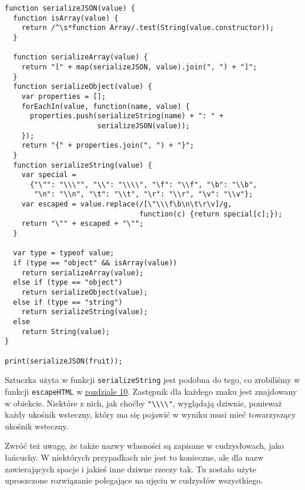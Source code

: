 \begin{verbatim} 
function serializeJSON(value) {
  function isArray(value) {
    return /^\s*function Array/.test(String(value.constructor));
  }

  function serializeArray(value) {
    return "[" + map(serializeJSON, value).join(", ") + "]";
  }
  function serializeObject(value) {
    var properties = [];
    forEachIn(value, function(name, value) {
      properties.push(serializeString(name) + ": " +
                      serializeJSON(value));
    });
    return "{" + properties.join(", ") + "}";
  }
  function serializeString(value) {
    var special =
      {"\"": "\\\"", "\\": "\\\\", "\f": "\\f", "\b": "\\b",
       "\n": "\\n", "\t": "\\t", "\r": "\\r", "\v": "\\v"};
    var escaped = value.replace(/[\"\\\f\b\n\t\r\v]/g,
                                function(c) {return special[c];});
    return "\"" + escaped + "\"";
  }

  var type = typeof value;
  if (type == "object" && isArray(value))
    return serializeArray(value);
  else if (type == "object")
    return serializeObject(value);
  else if (type == "string")
    return serializeString(value);
  else
    return String(value);
}

print(serializeJSON(fruit));
\end{verbatim}
    
Sztuczka użyta w funkcji \texttt{serializeString} jest podobna do tego, co zrobiliśmy w funkcji \texttt{escapeHTML} w \hyperref[chap:10]{rozdziale 10}. Zastępnik dla każdego znaku jest znajdowany w obiekcie. Niektóre z nich, jak choćby \texttt{"\textbackslash \textbackslash \textbackslash \textbackslash"}, wyglądają dziwnie, ponieważ każdy ukośnik wsteczny, który ma się pojawić w wyniku musi mieć towarzyszący ukośnik wsteczny.

    
Zwróć też uwagę, że także nazwy własności są zapisane w cudzysłowach, jako łańcuchy. W niektórych przypadkach nie jest to konieczne, ale dla nazw zawierających spacje i jakieś inne dziwne rzeczy tak. Tu zostało użyte uproszczone rozwiązanie polegające na ujęciu w cudzysłów wszystkiego.
